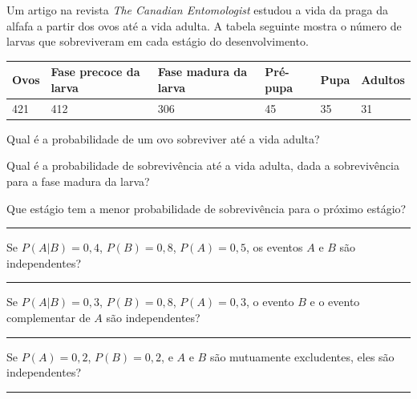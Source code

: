 \documentclass[a4paper,11pt,fleqn]{article}\usepackage[]{graphicx}\usepackage[]{color}
\theoremstyle{definition}
\begin{document}
\begin{compactenum}
\item Um artigo na revista \textit{The Canadian Entomologist} estudou a
  vida da praga da alfafa a partir dos ovos até a vida adulta. A tabela
  seguinte mostra o número de larvas que sobreviveram em cada estágio do
  desenvolvimento.
  \begin{table}[!h]
    \centering
    \begin{tabular}{lp{2cm}p{2cm}lll}
      Ovos & Fase precoce da larva & Fase madura da larva & Pré-pupa
      & Pupa & Adultos \\
      \hline
      421 & 412 & 306 & 45 & 35 & 31 \\
    \end{tabular}
  \end{table}
  \begin{compactenum}
  \item Qual é a probabilidade de um ovo sobreviver até a vida adulta?
  \item Qual é a probabilidade de sobrevivência até a vida adulta, dada
    a sobrevivência para a fase madura da larva?
  \item Que estágio tem a menor probabilidade de sobrevivência para o
    próximo estágio?
  \end{compactenum}

\vspace{0.3cm}
\hrule
\vspace{0.3cm}

\item Se $P(A|B) = 0,4$, $P(B) = 0,8$, $P(A) = 0,5$, os eventos $A$ e
  $B$ são independentes?

\vspace{0.3cm}
\hrule
\vspace{0.3cm}

\item Se $P(A|B) = 0,3$, $P(B) = 0,8$, $P(A) = 0,3$, o evento $B$ e o
  evento complementar de $A$ são independentes?

\vspace{0.3cm}
\hrule
\vspace{0.3cm}

\item Se $P(A) = 0,2$, $P(B) = 0,2$, e $A$ e $B$ são mutuamente
  excludentes, eles são independentes?

\vspace{0.3cm}
\hrule
\vspace{0.3cm}


\end{compactenum}
\end{document}
